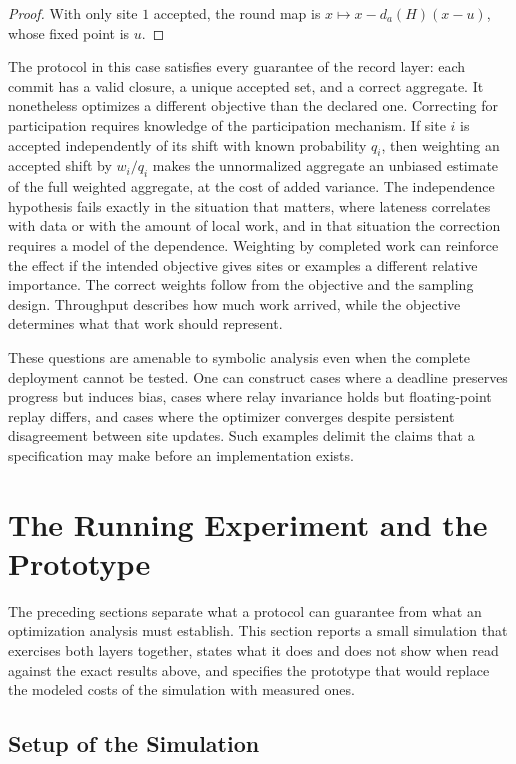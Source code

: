 \documentclass[11pt]{article}
\theoremstyle{definition}
\theoremstyle{remark}
\begin{document}
\begin{proof}
With only site $1$ accepted, the round map is $x\mapsto x-d_a(H)(x-u)$, whose fixed point is $u$.
\end{proof}

The protocol in this case satisfies every guarantee of the record layer: each commit has a valid closure, a unique accepted set, and a correct aggregate. It nonetheless optimizes a different objective than the declared one. Correcting for participation requires knowledge of the participation mechanism. If site $i$ is accepted independently of its shift with known probability $q_i$, then weighting an accepted shift by $w_i/q_i$ makes the unnormalized aggregate an unbiased estimate of the full weighted aggregate, at the cost of added variance. The independence hypothesis fails exactly in the situation that matters, where lateness correlates with data or with the amount of local work, and in that situation the correction requires a model of the dependence. Weighting by completed work can reinforce the effect if the intended objective gives sites or examples a different relative importance. The correct weights follow from the objective and the sampling design. Throughput describes how much work arrived, while the objective determines what that work should represent.

These questions are amenable to symbolic analysis even when the complete deployment cannot be tested. One can construct cases where a deadline preserves progress but induces bias, cases where relay invariance holds but floating-point replay differs, and cases where the optimizer converges despite persistent disagreement between site updates. Such examples delimit the claims that a specification may make before an implementation exists.

\section{The Running Experiment and the Prototype}\label{sec:experiment}

The preceding sections separate what a protocol can guarantee from what an optimization analysis must establish. This section reports a small simulation that exercises both layers together, states what it does and does not show when read against the exact results above, and specifies the prototype that would replace the modeled costs of the simulation with measured ones.

\subsection{Setup of the Simulation}
\end{document}
